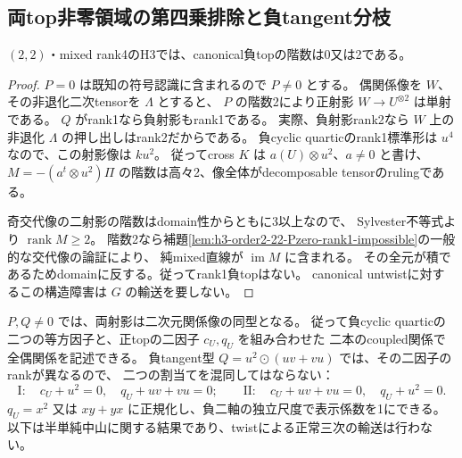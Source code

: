 \subsection{両top非零領域の第四乗排除と負tangent分枝}
\label{subsec:h3-order2-22-tangent-negative}
\begin{proposition}
\label{prop:h3-order2-22-negative-rank1-empty}
$(2,2)$・mixed rank4のH3では、canonical負topの階数は0又は2である。
\end{proposition}
\begin{proof}
$P=0$ は既知の符号認識に含まれるので $P\ne0$ とする。
偶関係像を $W$、その非退化二次tensorを $\Lambda$ とすると、
$P$ の階数2により正射影 $W\to U^{\otimes2}$ は単射である。
$Q$ がrank1なら負射影もrank1である。
実際、負射影rank2なら $W$ 上の非退化 $\Lambda$ の押し出しはrank2だからである。
負cyclic quarticのrank1標準形は $u^4$ なので、この射影像は $ku^2$。
従ってcross $K$ は $a(U)\otimes u^2$、$a\ne0$ と書け、
$M=-(a^t\otimes u^2)\Pi$ の階数は高々2、像全体がdecomposable tensorのrulingである。

奇交代像の二射影の階数はdomain性からともに3以上なので、
Sylvester不等式より $\operatorname{rank}M\ge2$。
階数2なら補題\ref{lem:h3-order2-22-Pzero-rank1-impossible}の一般的な交代像の論証により、
純mixed直線が $\operatorname{im}M$ に含まれる。
その全元が積であるためdomainに反する。従ってrank1負topはない。
canonical untwistに対するこの構造障害は $G$ の輸送を要しない。
\end{proof}

$P,Q\ne0$ では、両射影は二次元関係像の同型となる。
従って負cyclic quarticの二つの等方因子と、正topの二因子 $c_U,q_U$ を組み合わせた
二本のcoupled関係で全偶関係を記述できる。
負tangent型 $Q=u^2\odot(uv+vu)$ では、その二因子のrankが異なるので、
二つの割当てを混同してはならない：
\[
 \mathrm{I}:\quad c_U+u^2=0,\quad q_U+uv+vu=0;
 \qquad
 \mathrm{II}:\quad c_U+uv+vu=0,\quad q_U+u^2=0.
\]
$q_U=x^2$ 又は $xy+yx$ に正規化し、負二軸の独立尺度で表示係数を1にできる。
以下は半単純中山に関する結果であり、twistによる正常三次の輸送は行わない。

